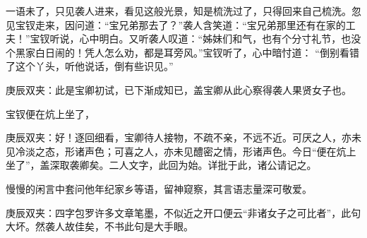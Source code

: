 \begin{parag}
    一语未了，只见袭人进来，看见这般光景，知是梳洗过了，只得回来自己梳洗。忽见宝钗走来，因问道：“宝兄弟那去了？”袭人含笑道：“宝兄弟那里还有在家的工夫！”宝钗听说，心中明白。又听袭人叹道：“姊妹们和气，也有个分寸礼节，也没个黑家白日闹的！凭人怎么劝，都是耳旁风。”宝钗听了，心中暗忖道： “倒别看错了这个丫头，听他说话，倒有些识见。”\begin{note}庚辰双夹：此是宝卿初试，已下渐成知已，盖宝卿从此心察得袭人果贤女子也。\end{note}宝钗便在炕上坐了，\begin{note}庚辰双夹：好！逐回细看，宝卿待人接物，不疏不亲，不远不近。可厌之人，亦未见冷淡之态，形诸声色；可喜之人，亦未见醴密之情，形诸声色。今日“便在炕上坐了”，盖深取袭卿矣。二人文字，此回为始。详批于此，诸公请记之。\end{note}慢慢的闲言中套问他年纪家乡等语，留神窥察，其言语志量深可敬爱。\begin{note}庚辰双夹：四字包罗许多文章笔墨，不似近之开口便云“非诸女子之可比者”，此句大坏。然袭人故佳矣，不书此句是大手眼。\end{note}
\end{parag}


